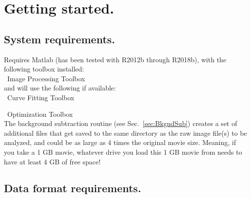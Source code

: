 \documentclass[11pt]{article}
\begin{document}
\clearpage

\section{Getting started.}

\subsection{System requirements.}

Requires Matlab (has been tested with R2012b through R2018b), with the following toolbox installed:\\

\noindent \textbullet~Image Processing Toolbox\\

\noindent and will use the following if available:\\

\noindent \textbullet~Curve Fitting Toolbox

\noindent \textbullet~Optimization Toolbox\\



 The background subtraction routine (see Sec.~\ref{sec:BkgndSub}) creates a set of additional files that get saved to the same directory as the raw image file(s) to be analyzed, and could be as large as 4 times the original movie size.  Meaning, if you take a 1 GB movie, whatever drive you load this 1 GB movie from needs to have at least 4 GB of free space! 

\subsection{Data format requirements.}
\end{document}
